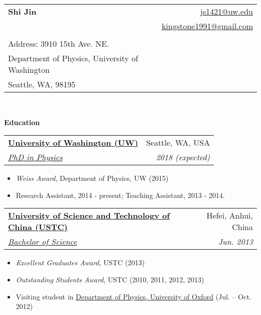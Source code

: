 \documentclass[letterpaper,12pt]{article}
\makeatletter
\newcommand{\resheading}[1]{{\large \colorbox{mygrey}{\begin{minipage}{\textwidth}{\textbf{#1 \vphantom{p\^{E}}}}\end{minipage}}}}
\newcommand{\ressubheading}[4]{
\begin{tabular*}{6.5in}{l@{\extracolsep{\fill}}r}
		\textbf{#1} & #2 \\
		\textit{#3} & \textit{#4} \\
\end{tabular*}\vspace{-6pt}}
\makeatother
\begin{document}
\newcommand{\mywebheader}{
\begin{tabular*}{7in}{l@{\extracolsep{\fill}}r}
	\textbf{{\huge Shi Jin}} & \href{mailto:js1421@uw.edu}{js1421@uw.edu}\\
&   \href{mailto:kingstone1991@gmail.com}{kingstone1991@gmail.com} \\
  & \Mobilefone{ $\mathnormal{+1}$ $\mathnormal{2066050419}$}\\
  { \footnotesize Address:  3910 15th Ave. NE. } & \\
  { \footnotesize Department of Physics, University of Washington }& \\
  { \footnotesize Seattle, WA, 98195} &
	\end{tabular*}
\\
\vspace{0.1in}}

\mywebheader



\resheading{Education}	
\ressubheading{\href{http://www.uw.edu}{University of Washington (UW) }}{\hspace{7.7cm} Seattle, WA, USA}{\href{https://sharepoint.washington.edu/phys/Pages/default.aspx}{PhD in Physics}}{\hspace{7.5cm} 2018 (expected) }
			\begin{itemize}
			\itemsep0em
	\item
	\textit{Weiss Award},  Department of Physics, UW (2015)		 	  
	\item Research Assistant, 2014 - present; Teaching Assistant, 2013 - 2014.
        \end{itemize}

				
\ressubheading{\href{http://en.ustc.edu.cn}{University of Science and Technology of China (USTC) }}{\hspace{2.5cm} Hefei, Anhui, China}{\href{http://physics.ustc.edu.cn}{Bachelor of Science}}{\hspace{2.5cm} Jun. 2013}
				\begin{itemize}
				\item
				\textit{Excellent Graduates Award}, USTC (2013)
                        \item  
     \textit{Outstanding Students Award}, USTC (2010, 2011, 2012, 2013)
     \item
     Visiting student in {\href{http://www2.physics.ox.ac.uk/}{ Department of Physics, University of Oxford}} (Jul. -- Oct. 2012)
				\end{itemize}						
								
\end{document}
